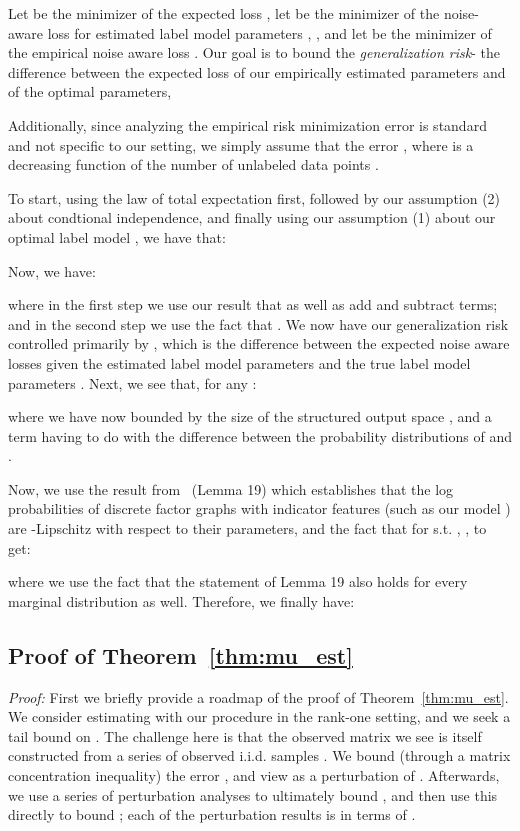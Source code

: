 \documentclass[letterpaper]{article}
\begin{document}
\begin{appendix}
Let  be the minimizer of the expected loss , let  be the minimizer of the noise-aware loss for estimated label model parameters , , and let  be the minimizer of the empirical noise aware loss .
Our goal is to bound the \textit{generalization risk}- the difference between the expected loss of our empirically estimated parameters and of the optimal parameters,


Additionally, since analyzing the empirical risk minimization error is standard and not specific to our setting, we simply assume that the error , where  is a decreasing function of the number of unlabeled data points .

To start, using the law of total expectation first, followed by our assumption (2) about condtional independence, and finally using our assumption (1) about our optimal label model , we have that:

Now, we have:

where in the first step we use our result that  as well as add and subtract terms; and in the second step we use the fact that .
We now have our generalization risk controlled primarily by , which is the difference between the expected noise aware losses given the estimated label model parameters  and the true label model parameters .
Next, we see that, for any :

where we have now bounded  by the size of the structured output space , and a term having to do with the difference between the probability distributions of  and .

Now, we use the result from~\citep{honorio2012lipschitz} (Lemma 19) which establishes that the log probabilities of discrete factor graphs with indicator features (such as our model ) are -Lipschitz with respect to their parameters, and the fact that for  s.t. , , to get:

where we use the fact that the statement of Lemma 19 also holds for every marginal distribution as well.
Therefore, we finally have:


\subsection{Proof of Theorem~\ref{thm:mu_est}}
\label{appendix:theorem-2}
\textit{Proof:} 
First we briefly provide a roadmap of the proof of Theorem~\ref{thm:mu_est}.
We consider estimating  with our procedure in the rank-one setting, and we seek a tail bound on .
The challenge here is that the observed matrix  we see is itself constructed from a series of observed i.i.d. samples .
We bound (through a matrix concentration inequality) the error , and view  as a perturbation of .
Afterwards, we use a series of perturbation analyses to ultimately bound , and then use this directly to bound ; each of the perturbation results is in terms of .


\end{appendix}
\end{document}
